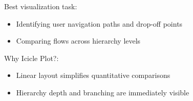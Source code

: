 \begin{exercise}
        Best visualization task:
        \begin{itemize}
            \item Identifying user navigation paths and drop-off points
            \item Comparing flows across hierarchy levels
        \end{itemize}

        Why Icicle Plot?:
        \begin{itemize}
            \item Linear layout simplifies quantitative comparisons
            \item Hierarchy depth and branching are immediately visible
        \end{itemize}
    \end{exercise}    

